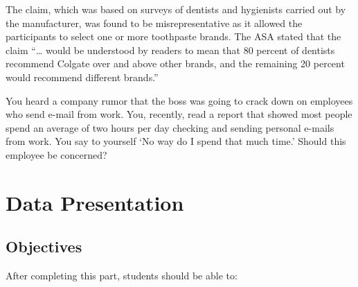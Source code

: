\documentclass[11pt, chapterprefix=true]{scrbook}\usepackage[]{graphicx}\usepackage[]{color}
\begin{document}
\begin{exercises}
\begin{exercise}
\end{exercise}
\begin{solution}    %

The claim, which was based on surveys of dentists and hygienists carried out by the manufacturer, was found to be misrepresentative as it allowed the participants to select one or more toothpaste brands. The ASA stated that the claim ``… would be understood by readers to mean that 80 percent of dentists recommend Colgate over and above other brands, and the remaining 20 percent would recommend different brands.''

\end{solution}

\begin{exercise}   %

You heard a company rumor that the boss was going to crack down on employees who send e-mail from work.  You, recently, read a report that showed most people spend an average of two hours per day checking and sending personal e-mails from work.  You say to yourself `No way do I spend that much time.'  Should this employee be concerned?    

\end{exercise}
\begin{solution}    %

\end{solution}






\end{exercises}

\onecolumn




\chapter{Data Presentation}
\label{chap:ch2}

\section{Objectives}

After completing this part, students should be able to:

\end{document}
